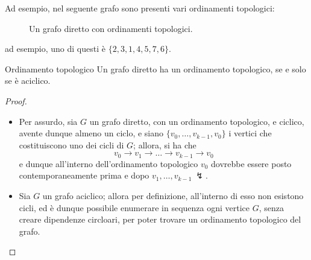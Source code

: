 \documentclass[a4paper, 12pt]{report}
\begin{document}
    \begin{example}
        Ad esempio, nel seguente grafo sono presenti vari ordinamenti topologici:

        \begin{figure}[H]
            \centering
            \caption{Un grafo diretto con ordinamenti topologici.}
        \end{figure}

        ad esempio, uno di questi è $\{2, 3, 1, 4, 5, 7, 6\}$.
    \end{example}

    \begin{framedthm}[label={Ordinamento topologico}]{Ordinamento topologico}
        Un grafo diretto ha un ordinamento topologico, se e solo se è aciclico.
    \end{framedthm}

    \begin{proof}
        \hspace{0.7cm}
        \begin{itemize}
            \item[]  Per assurdo, sia $G$ un grafo diretto, con un ordinamento topologico, e ciclico, avente dunque almeno un ciclo, e siano $\{v_0, \ldots , v_{k - 1}, v_0\}$ i vertici che costituiscono uno dei cicli di $G$; allora, si ha che $$v_0 \rightarrow v_1 \rightarrow \ldots \rightarrow v_{k - 1} \rightarrow v_0$$ e dunque all'interno dell'ordinamento topologico $v_0$ dovrebbe essere posto contemporaneamente prima e dopo $v_1, \ldots, v_{k - 1} \ \lightning$.
            \item[]  Sia $G$ un grafo aciclico; allora per definizione, all'interno di esso non esistono cicli, ed è dunque possibile enumerare in sequenza ogni vertice $G$, senza creare dipendenze circloari, per poter trovare un ordinamento topologico del grafo.
        \end{itemize}
    \end{proof}
\end{document}
